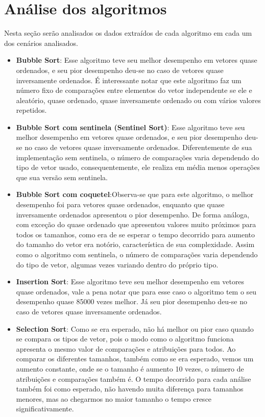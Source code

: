 \documentclass{article}
\begin{document}
\section{Análise dos algoritmos}
Nesta seção serão analisados os dados extraídos de cada algoritmo em cada um dos cenários analisados.
\begin{itemize}
    \item \textbf{Bubble Sort}: Esse algoritmo teve seu melhor desempenho em vetores quase ordenados, e seu pior desempenho deu-se no caso de vetores quase inversamente ordenados. É interessante notar que este algoritmo faz um número fixo de comparações entre elementos do vetor independente se ele e aleatório, quase ordenado, quase inversamente ordenado ou com vários valores repetidos.
    \item \textbf{Bubble Sort com sentinela (Sentinel Sort)}: Esse algoritmo teve seu melhor desempenho em vetores quase ordenados, e seu pior desempenho deu-se no caso de vetores quase inversamente ordenados. Diferentemente de sua implementação sem sentinela, o número de comparações varia dependendo do tipo de vetor usado, consequentemente, ele realiza em média menos operações que sua versão sem sentinela.
    \item \textbf{Bubble Sort com coquetel}:Observa-se que para este algoritmo, o melhor desempenho foi para vetores quase ordenados, enquanto que quase inversamente ordenados apresentou o pior desempenho. De forma análoga, com exceção do quase ordenado que apresentou valores muito próximos para todos os tamanhos, como era de se esperar o tempo decorrido para aumento do tamanho do vetor era notório, característica de sua complexidade. Assim como o algoritmo com sentinela, o número de comparações varia dependendo do tipo de vetor, algumas vezes variando dentro do próprio tipo.
    \item \textbf{Insertion Sort}: Esse algoritmo teve seu melhor desempenho em vetores quase ordenados, vale a pena notar que para esse caso o algoritmo tem o seu desempenho quase 85000 vezes melhor. Já seu pior desempenho deu-se no caso de vetores quase inversamente ordenados.
    \item \textbf{Selection Sort}: Como se era esperado, não há melhor ou pior caso quando se compara os tipos de vetor, pois o modo como o algoritmo funciona apresenta o mesmo valor de comparações e atribuições para todos. Ao comparar os diferentes tamanhos, também como se era esperado, vemos um aumento constante, onde se o tamanho é aumento 10 vezes, o número de atribuições e comparações também é. O tempo decorrido para cada análise também foi como esperado, não havendo muita diferença para tamanhos menores, mas ao chegarmos no maior tamanho o tempo cresce significativamente.

\end{itemize}
\end{document}
